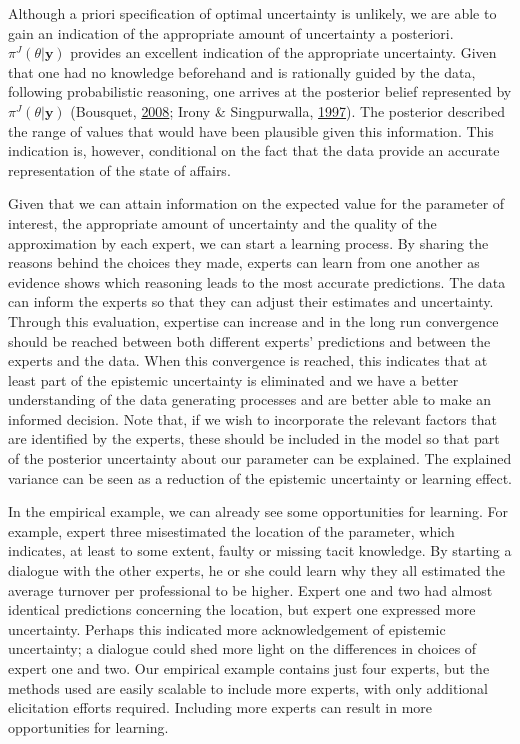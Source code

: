 \documentclass[openright,titlepage,12pt,a4paper]{book}
\begin{document}
Although a priori specification of optimal uncertainty is unlikely, we are able to gain an indication of the appropriate amount of uncertainty a posteriori. \(\pi^J(\theta|\textbf{y})\) provides an excellent indication of the appropriate uncertainty. Given that one had no knowledge beforehand and is rationally guided by the data, following probabilistic reasoning, one arrives at the posterior belief represented by \(\pi^J(\theta|\textbf{y})\) (Bousquet, \protect\hyperlink{ref-bousquet_diagnostics_2008}{2008}; Irony \& Singpurwalla, \protect\hyperlink{ref-irony_noninformative_1997}{1997}). The posterior described the range of values that would have been plausible given this information. This indication is, however, conditional on the fact that the data provide an accurate representation of the state of affairs.

Given that we can attain information on the expected value for the parameter of interest, the appropriate amount of uncertainty and the quality of the approximation by each expert, we can start a learning process. By sharing the reasons behind the choices they made, experts can learn from one another as evidence shows which reasoning leads to the most accurate predictions. The data can inform the experts so that they can adjust their estimates and uncertainty. Through this evaluation, expertise can increase and in the long run convergence should be reached between both different experts' predictions and between the experts and the data. When this convergence is reached, this indicates that at least part of the epistemic uncertainty is eliminated and we have a better understanding of the data generating processes and are better able to make an informed decision. Note that, if we wish to incorporate the relevant factors that are identified by the experts, these should be included in the model so that part of the posterior uncertainty about our parameter can be explained. The explained variance can be seen as a reduction of the epistemic uncertainty or learning effect.

In the empirical example, we can already see some opportunities for learning. For example, expert three misestimated the location of the parameter, which indicates, at least to some extent, faulty or missing tacit knowledge. By starting a dialogue with the other experts, he or she could learn why they all estimated the average turnover per professional to be higher. Expert one and two had almost identical predictions concerning the location, but expert one expressed more uncertainty. Perhaps this indicated more acknowledgement of epistemic uncertainty; a dialogue could shed more light on the differences in choices of expert one and two. Our empirical example contains just four experts, but the methods used are easily scalable to include more experts, with only additional elicitation efforts required. Including more experts can result in more opportunities for learning.
\end{document}

